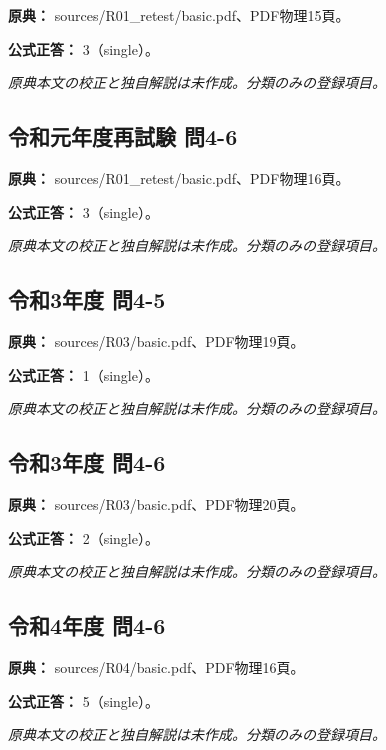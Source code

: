 \noindent\textbf{原典：} sources/R01\_retest/basic.pdf、PDF物理15頁。

\textbf{公式正答：} 3（single）。

\par\textit{原典本文の校正と独自解説は未作成。分類のみの登録項目。}

\subsection{令和元年度再試験 問4-6}
\label{q:r01-ret-basic-4-6}

\noindent\textbf{原典：} sources/R01\_retest/basic.pdf、PDF物理16頁。

\textbf{公式正答：} 3（single）。

\par\textit{原典本文の校正と独自解説は未作成。分類のみの登録項目。}

\subsection{令和3年度 問4-5}
\label{q:r03-reg-basic-4-5}

\noindent\textbf{原典：} sources/R03/basic.pdf、PDF物理19頁。

\textbf{公式正答：} 1（single）。

\par\textit{原典本文の校正と独自解説は未作成。分類のみの登録項目。}

\subsection{令和3年度 問4-6}
\label{q:r03-reg-basic-4-6}

\noindent\textbf{原典：} sources/R03/basic.pdf、PDF物理20頁。

\textbf{公式正答：} 2（single）。

\par\textit{原典本文の校正と独自解説は未作成。分類のみの登録項目。}

\subsection{令和4年度 問4-6}
\label{q:r04-reg-basic-4-6}

\noindent\textbf{原典：} sources/R04/basic.pdf、PDF物理16頁。

\textbf{公式正答：} 5（single）。

\par\textit{原典本文の校正と独自解説は未作成。分類のみの登録項目。}

